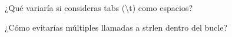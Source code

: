 
\begin{DoxyEnumerate}
\item ¿\+Qué variaría si consideras tabs (\textbackslash{}t) como espacios?
\item ¿\+Cómo evitarías múltiples llamadas a strlen dentro del bucle? 
\end{DoxyEnumerate}